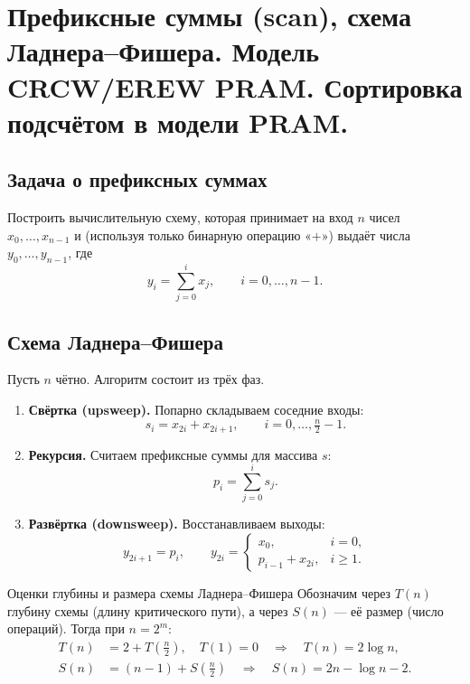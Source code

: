 
\section{Префиксные суммы (scan), схема Ладнера–Фишера. Модель CRCW/EREW PRAM. Сортировка подсчётом в модели PRAM.}

\subsection{Задача о префиксных суммах}

Построить вычислительную схему, которая принимает на вход $n$ чисел $x_0, \dots, x_{n-1}$ и (используя только бинарную операцию «$+$») выдаёт числа $y_0, \dots, y_{n-1}$, где
\[
y_i = \sum_{j=0}^{i} x_j, \qquad i = 0, \dots, n-1.
\]

\subsection{Схема Ладнера–Фишера}

Пусть $n$ чётно. Алгоритм состоит из трёх фаз.

\begin{enumerate}
	\item \textbf{Свёртка (upsweep).} Попарно складываем соседние входы:
	\[
	s_i = x_{2i} + x_{2i+1}, \qquad i = 0, \dots, \tfrac{n}{2} - 1.
	\]
	
	\item \textbf{Рекурсия.} Считаем префиксные суммы для массива $s$:
	\[
	p_i = \sum_{j=0}^{i} s_j.
	\]
	
	\item \textbf{Развёртка (downsweep).} Восстанавливаем выходы:
	\[
	y_{2i+1} = p_i, \qquad
	y_{2i} =
	\begin{cases}
		x_0, & i = 0, \\
		p_{i-1} + x_{2i}, & i \geq 1.
	\end{cases}
	\]
\end{enumerate}

\begin{Statement}{Оценки глубины и размера схемы Ладнера–Фишера}{}
	Обозначим через $T(n)$ глубину схемы (длину критического пути), а через $S(n)$ — её размер (число операций). Тогда при $n = 2^m$:
	\begin{align*}
		T(n) &= 2 + T\!\left(\tfrac{n}{2}\right), \quad T(1) = 0
		\quad \Longrightarrow \quad T(n) = 2\log n, \\
		S(n) &= (n-1) + S\!\left(\tfrac{n}{2}\right)
		\quad \Longrightarrow \quad S(n) = 2n - \log n - 2.
	\end{align*}
\end{Statement}

